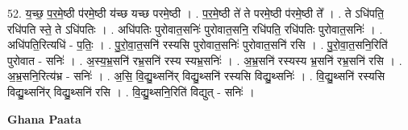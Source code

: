 \documentclass[17pt]{extarticle}
\begin{document}
52. य॒च्छ॒ प॒र॒मे॒ष्ठी प॑रमे॒ष्ठी य॑च्छ यच्छ परमे॒ष्ठी । . प॒र॒मे॒ष्ठी ते॑ ते परमे॒ष्ठी प॑रमे॒ष्ठी ते᳚ । . ते ऽधि॑पति॒ रधि॑पति स्ते॒ ते ऽधि॑पतिः । . अधि॑पतिः पुरोवात॒सनिः॑ पुरोवात॒सनि॒ रधि॑पति॒ रधि॑पतिः पुरोवात॒सनिः॑ । . अधि॑पति॒रित्यधि॑ - प॒तिः॒ । . पु॒रो॒वा॒त॒सनि॑ रस्यसि पुरोवात॒सनिः॑ पुरोवात॒सनि॑ रसि । . पु॒रो॒वा॒त॒सनि॒रिति॑ पुरोवात - सनिः॑ । . अ॒स्य॒भ्र॒सनि॑ रभ्र॒सनि॑ रस्य स्यभ्र॒सनिः॑ । . अ॒भ्र॒सनि॑ रस्यस्य भ्र॒सनि॑ रभ्र॒सनि॑ रसि । . अ॒भ्र॒सनि॒रित्य॑भ्र - सनिः॑ । . अ॒सि॒ वि॒द्यु॒थ्सनि॑र् विद्यु॒थ्सनि॑ रस्यसि विद्यु॒थ्सनिः॑ । . वि॒द्यु॒थ्सनि॑ रस्यसि विद्यु॒थ्सनि॑र् विद्यु॒थ्सनि॑ रसि । . वि॒द्यु॒थ्सनि॒रिति॑ विद्युत् - सनिः॑ । \newline

\textbf{Ghana Paata } \newline
\end{document}
